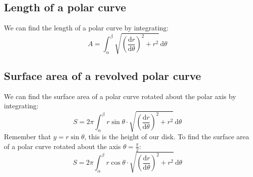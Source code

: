 \documentclass{report}
\begin{document}
    \subsection{Length of a polar curve}
        We can find the length of a polar curve by integrating:
        \[A = \int_\alpha^\beta \sqrt{\left(\frac{\mathrm{d}r}{\mathrm{d}\theta}\right)^2 + r^2} \, \mathrm{d} \theta\]
    
    \subsection{Surface area of a revolved polar curve}
        We can find the surface area of a polar curve rotated about the polar axis by integrating:
        \[S = 2 \pi \int_\alpha^\beta r \sin \theta \cdot \sqrt{\left(\frac{\mathrm{d}r}{\mathrm{d}\theta}\right)^2 + r^2} \, \mathrm{d} \theta\]
        Remember that \(y = r \sin \theta\), this is the height of our disk.
        To find the surface area of a polar curve rotated about the axis \(\theta = \frac{\pi}{2}\):
        \[S = 2 \pi \int_\alpha^\beta r \cos \theta \cdot \sqrt{\left(\frac{\mathrm{d}r}{\mathrm{d}\theta}\right)^2 + r^2} \, \mathrm{d} \theta\]
    
\end{document}
